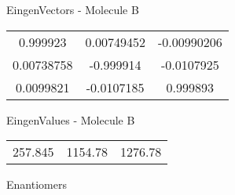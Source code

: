 \begin{multicols}{2}
\begin{center}
\vtab
 EingenVectors - Molecule B     \\
\vtab
\begin{tabular}{|c c c|}
0.999923	 & 	0.00749452	 & 	-0.00990206	 \\
0.00738758	 & 	-0.999914	 & 	-0.0107925	 \\
0.0099821	 & 	-0.0107185	 & 	0.999893
\end{tabular}

\vtab
 EingenValues - Molecule B     \\
\vtab
\begin{tabular}{|c c c|}
257.845	 & 	1154.78	 & 	1276.78	 \\
\end{tabular}

\end{center}
\end{multicols}
\begin{center}
\vtab
\vtab
\textcolor{NavyBlue}{\Large Enantiomers}
\end{center}

 \newpage

